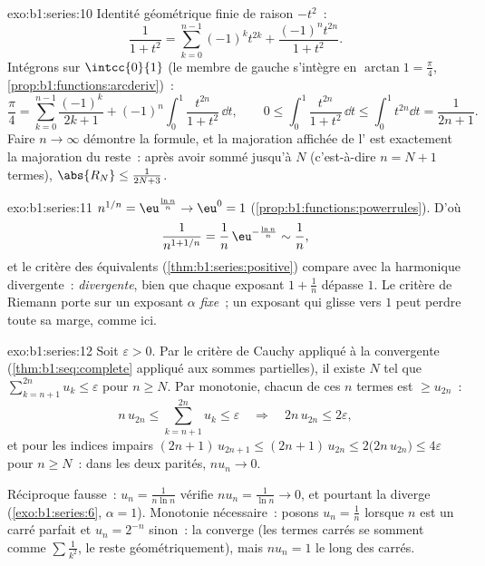 \begin{solution}{exo:b1:series:10}
Identité géométrique finie de raison $-t^2$~:
\[
\frac{1}{1 + t^2} = \sum_{k=0}^{n-1} (-1)^k t^{2k}
+ \frac{(-1)^n t^{2n}}{1 + t^2} .
\]
Intégrons sur $\intcc{0}{1}$ (le membre de gauche s'intègre en
$\arctan 1 = \frac\pi4$, \cref{prop:b1:functions:arcderiv})~:
\[
\frac{\pi}{4} = \sum_{k=0}^{n-1} \frac{(-1)^k}{2k+1}
+ (-1)^n \int_0^1 \frac{t^{2n}}{1+t^2}\,\dd t,
\qquad
0 \leq \int_0^1 \frac{t^{2n}}{1+t^2}\,\dd t \leq \int_0^1 t^{2n}\dd
t = \frac{1}{2n+1} .
\]
Faire $n \to \infty$ démontre la formule, et la majoration affichée de
l' est exactement la majoration du reste~: après avoir sommé
jusqu'à $N$ (c'est-à-dire $n = N + 1$ termes), $\abs{R_N} \leq
\frac{1}{2N + 3}$.
\end{solution}

\begin{solution}{exo:b1:series:11}
$n^{1/n} = \eu^{\frac{\ln n}{n}} \to \eu^0 = 1$
(\cref{prop:b1:functions:powerrules}). D'où
\[
\frac{1}{n^{1 + 1/n}} = \frac{1}{n}\,\eu^{-\frac{\ln n}{n}}
\sim \frac{1}{n} ,
\]
et le critère des équivalents (\cref{thm:b1:series:positive})
compare avec la  harmonique divergente~: \emph{divergente},
bien que chaque exposant $1 + \frac1n$ dépasse $1$. Le critère de
Riemann porte sur un exposant $\alpha$ \emph{fixe}~; un exposant qui
glisse vers $1$ peut perdre toute sa marge, comme ici.
\end{solution}

\begin{solution}{exo:b1:series:12}
Soit $\varepsilon > 0$. Par le critère de Cauchy appliqué à la 
convergente (\cref{thm:b1:seq:complete} appliqué aux sommes
partielles), il existe $N$ tel que $\sum_{k=n+1}^{2n} u_k \leq
\varepsilon$ pour $n \geq N$. Par monotonie, chacun de ces $n$
termes est $\geq u_{2n}$~:
\[
n\,u_{2n} \leq \sum_{k=n+1}^{2n} u_k \leq \varepsilon
\quad\Longrightarrow\quad 2n\,u_{2n} \leq 2\varepsilon ,
\]
et pour les indices impairs $(2n+1)\,u_{2n+1} \leq (2n+1)\,u_{2n}
\leq 2\bigl(2n\,u_{2n}\bigr) \leq 4\varepsilon$ pour $n \geq N$~:
dans les deux parités, $n u_n \to 0$.

Réciproque fausse~: $u_n = \frac{1}{n\ln n}$ vérifie $n u_n =
\frac{1}{\ln n} \to 0$, et pourtant la  diverge
(\cref{exo:b1:series:6}, $\alpha = 1$). Monotonie nécessaire~:
posons $u_n = \frac1n$ lorsque $n$ est un carré parfait et $u_n =
2^{-n}$ sinon~: la  converge (les termes carrés se somment
comme $\sum \frac{1}{k^2}$, le reste géométriquement), mais $n u_n =
1$ le long des carrés.
\end{solution}

